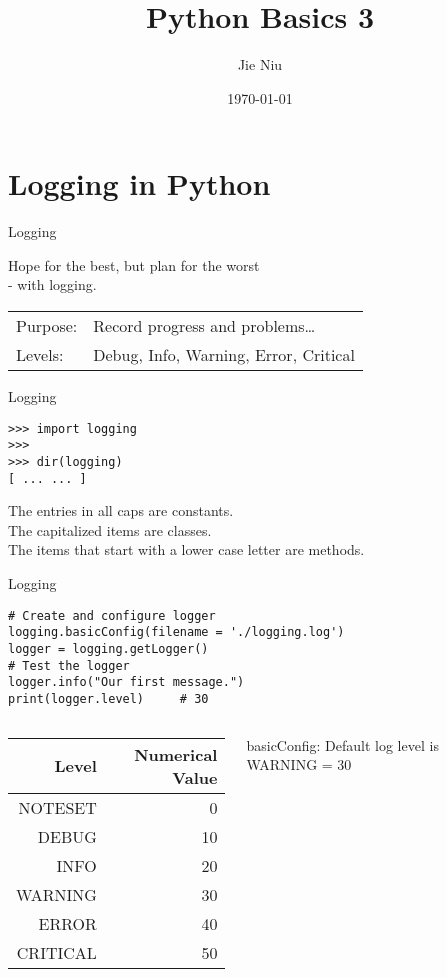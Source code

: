 \documentclass{beamer}
\title{Python Basics 3}
\author{Jie Niu}
\institute{IGWES, JNU}
\date{\today}
\begin{document}
\begin{frame}
\titlepage
\end{frame}

\section{Logging in Python}

\begin{frame}
\begin{center}
{\Huge Logging\par} \vspace{10pt}
{\LARGE Hope for the best, but plan for the worst\\
- with logging.\par} \vspace{20pt}
\end{center}
\begin{tabular}{ll}
\hspace{10pt}Purpose: &Record progress and problems\dots\\
\hspace{10pt}Levels:  &Debug, Info, Warning, Error, Critical
\end{tabular}
\end{frame}

\begin{frame}[fragile]{Logging}
\begin{verbatim}
>>> import logging
>>>
>>> dir(logging)
[ ... ... ]
\end{verbatim}
The entries in all caps are constants.\\
The capitalized items are classes.\\
The items that start with a lower case letter are methods.
\end{frame}

\begin{frame}[fragile]{Logging}
\begin{verbatim}
# Create and configure logger
logging.basicConfig(filename = './logging.log')
logger = logging.getLogger()
# Test the logger
logger.info("Our first message.")
print(logger.level)     # 30
\end{verbatim}
\begin{columns}
\begin{column}{.5\textwidth}
\small
\begin{tabular}{rr}
    \textbf{Level} & \textbf{Numerical Value}\\
    \hline
    NOTESET        & 0\\
    DEBUG          & 10\\
    INFO           & 20\\
    WARNING        & 30\\
    ERROR          & 40\\
    CRITICAL       & 50\\
\end{tabular}
\end{column}
\begin{column}{0.5\textwidth}
    basicConfig: Default log level is WARNING = 30
\end{column}
\end{columns}
\end{frame}
\end{document}
